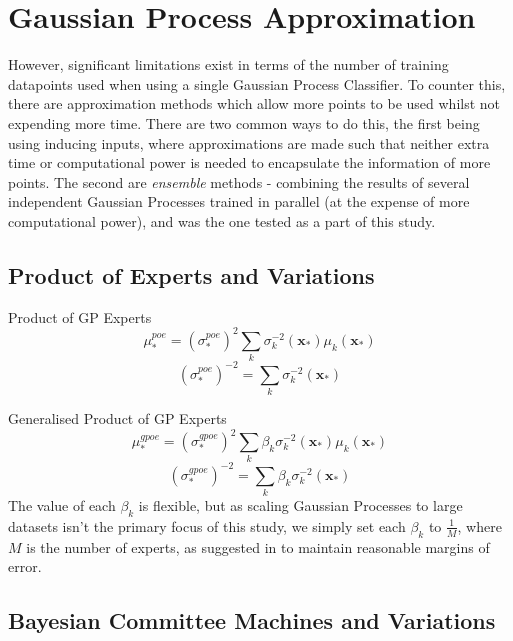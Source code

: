 \section{Gaussian Process Approximation} \label{chapsec:gp-approx}

However, significant limitations exist in terms of the number of training datapoints used when using a single Gaussian Process Classifier. To counter this, there are approximation methods which allow more points to be used whilst not expending more time. There are two common ways to do this, the first being using inducing inputs, where approximations are made such that neither extra time or computational power is needed to encapsulate the information of more points. The second are \textit{ensemble} methods - combining the results of several independent Gaussian Processes trained in parallel (at the expense of more computational power), and was the one tested as a part of this study.

\subsection{Product of Experts and Variations}

Product of GP Experts
\begin{equation}
    \mu_*^{poe} = (\sigma_*^{poe})^2 \sum_k \sigma_k^{-2} (\mathbf{x_*}) \mu_k (\mathbf{x_*})
\end{equation}
\begin{equation}
    (\sigma_*^{poe})^{-2} = \sum_k \sigma_k^{-2} (\mathbf{x_*})
\end{equation}

Generalised Product of GP Experts
\begin{equation}
    \mu_*^{gpoe} = (\sigma_*^{gpoe})^2 \sum_k \beta_k \sigma_k^{-2} (\mathbf{x_*}) \mu_k (\mathbf{x_*})
\end{equation}
\begin{equation}
    (\sigma_*^{gpoe})^{-2} = \sum_k \beta_k \sigma_k^{-2} (\mathbf{x_*})
\end{equation}
The value of each $\beta_k$ is flexible, but as scaling Gaussian Processes to large datasets isn't the primary focus of this study, we simply set each $\beta_k$ to $\frac{1}{M}$, where $M$ is the number of experts, as suggested in \citep{deisenroth15} to maintain reasonable margins of error.

\subsection{Bayesian Committee Machines and Variations}

